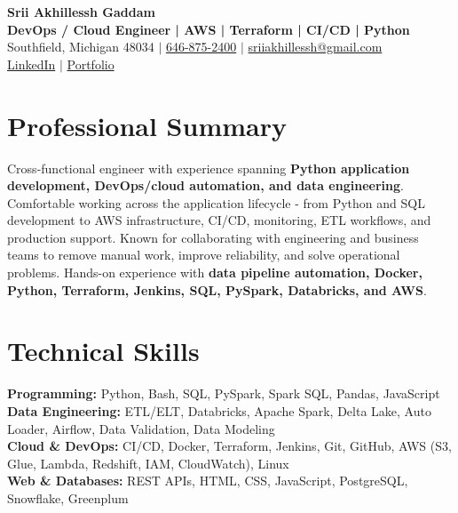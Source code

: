 \documentclass[letterpaper,10pt]{article}
\begin{document}
\fontsize{9.35pt}{10.45pt}\selectfont

\begin{center}
    {\LARGE \textbf{Srii Akhillessh Gaddam}} \\[-1pt]
    \textbf{DevOps / Cloud Engineer | AWS | Terraform | CI/CD | Python} \\[2pt]
    Southfield, Michigan 48034 $|$
    \href{tel:6468752400}{646-875-2400} $|$
    \href{mailto:sriiakhillessh@gmail.com}{sriiakhillessh@gmail.com} \\[1pt]
    \href{https://www.linkedin.com/in/srii-akhiilessh-gaddam-b48668191/}{LinkedIn} $|$
    \href{https://sriiakhillesshg.github.io/portfolio/}{Portfolio}
\end{center}
\vspace{-8pt}

\section{Professional Summary}
\small{Cross-functional engineer with experience spanning \textbf{Python application development, DevOps/cloud automation, and data engineering}. Comfortable working across the application lifecycle - from Python and SQL development to AWS infrastructure, CI/CD, monitoring, ETL workflows, and production support. Known for collaborating with engineering and business teams to remove manual work, improve reliability, and solve operational problems. Hands-on experience with \textbf{data pipeline automation, Docker, Python, Terraform, Jenkins, SQL, PySpark, Databricks, and AWS}.}

\section{Technical Skills}
\small{
\textbf{Programming:} Python, Bash, SQL, PySpark, Spark SQL, Pandas, JavaScript \\
\textbf{Data Engineering:} ETL/ELT, Databricks, Apache Spark, Delta Lake, Auto Loader, Airflow, Data Validation, Data Modeling \\
\textbf{Cloud \& DevOps:} CI/CD, Docker, Terraform, Jenkins, Git, GitHub, AWS (S3, Glue, Lambda, Redshift, IAM, CloudWatch), Linux \\
\textbf{Web \& Databases:} REST APIs, HTML, CSS, JavaScript, PostgreSQL, Snowflake, Greenplum
}
\end{document}
